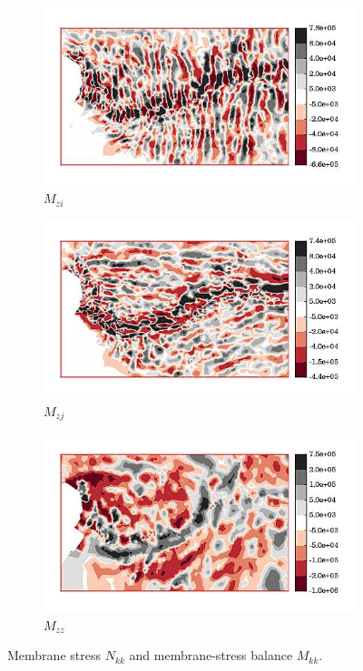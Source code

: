 \begin{figure}
  \begin{subfigure}[b]{0.32\linewidth}
    \includegraphics[width=\linewidth]{images/internal_energy/jakob_results/inversion_Wc_0.01/stress_balance/M_zi.jpg}
  \caption{$M_{zi}$}
  \label{M_zi}
  \end{subfigure}
  \begin{subfigure}[b]{0.32\linewidth}
    \includegraphics[width=\linewidth]{images/internal_energy/jakob_results/inversion_Wc_0.01/stress_balance/M_zj.jpg}
  \caption{$M_{zj}$}
  \label{M_zj}
  \end{subfigure}
  \begin{subfigure}[b]{0.32\linewidth}
    \includegraphics[width=\linewidth]{images/internal_energy/jakob_results/inversion_Wc_0.01/stress_balance/M_zz.jpg}
  \caption{$M_{zz}$}
  \label{M_zz}
  \end{subfigure}

  \caption[Jakobshavn membrane stress]{Membrane stress $N_{kk}$ and membrane-stress balance $M_{kk}$.}
  \label{jakobshavn_membrane_stress_balance}

\end{figure}
